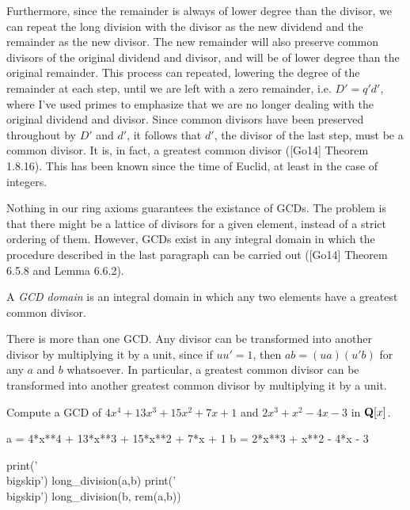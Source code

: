 Furthermore, since the remainder is always of lower degree than the
divisor, we can repeat the long division with the divisor as the new
dividend and the remainder as the new divisor.  The new remainder will
also preserve common divisors of the original dividend and divisor,
and will be of lower degree than the original remainder.  This process
can repeated, lowering the degree of the remainder at each step, until
we are left with a zero remainder, i.e. $D' = q' d'$, where I've used
primes to emphasize that we are no longer dealing with the original
dividend and divisor.  Since common divisors have been preserved
throughout by $D'$ and $d'$, it follows that $d'$, the divisor of the
last step, must be a common divisor.  It is, in fact, a greatest
common divisor ([Go14] Theorem 1.8.16).  This has been known since the
time of Euclid, at least in the case of integers.

Nothing in our ring axioms guarantees the existance of GCDs.  The
problem is that there might be a lattice of divisors for a given
element, instead of a strict ordering of them.  However, GCDs exist in
any integral domain in which the procedure described in the last
paragraph can be carried out ([Go14] Theorem 6.5.8 and Lemma 6.6.2).

\begin{key point}
A {\it GCD domain} is an integral domain in which
any two elements have a greatest common divisor.
\end{key point}

There is more than one GCD.  Any divisor can be transformed into
another divisor by multiplying it by a unit, since if $uu'=1$, then
$ab=(ua)(u'b)$ for any $a$ and $b$ whatsoever.  In particular, a
greatest common divisor can be transformed into another greatest
common divisor by multiplying it by a unit.

\begin{comment}
I leave without proof the
claims that in ${\cal F}[x]$, the units are all elements in ${\cal
F}$, and that all GCDs differ from each other by a unit multiple.
\end{comment}

\vfill\eject

\example

Compute a GCD of $4x^4+13x^3+15x^2+7x+1$ and $2x^3+x^2-4x-3$ in ${\bf Q}[x]$.

\bigskip


\bigskip

\begin{sympycode}
a = 4*x**4 + 13*x**3 + 15*x**2 + 7*x + 1
b = 2*x**3 + x**2 - 4*x - 3

print('\\bigskip')
long_division(a,b)
print('\\bigskip')
long_division(b, rem(a,b))
\end{sympycode}

